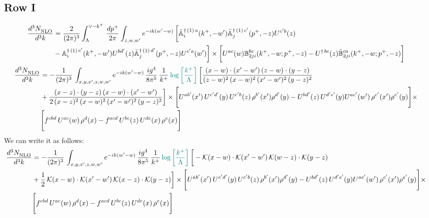 \documentclass[9pt]{article}
\def\mf#1{\mathbb{#1}}
\numberwithin{equation}{section}
\begin{document}
\subsection{Row I}
\begin{align}
 \frac{d^{3}N_{\rm NLO}^{\rm}}{d^{3}k}  & =    \frac{2}{(2\pi)^{3}} \int_{\Lambda}^{\vee - k^{+}}\, \frac{dp^{+}}{2\pi}\int_{z,w,w^{\prime}} e^{-ik(w^{\prime}-w)}\, 
        \bigg[\Bar{\mf{A}}^{\dagger\, (1)\, a}_{i}(k^{+},-w^{\prime})\Bar{\mf{A}}^{\dagger\, (1)\, c^{\prime}}_{j}(p^{+},-z)U^{c^{\prime}b}(z)\notag \\ & -\mf{A}^{\dagger\, (1)\, c^{\prime}}_{i}(k^{+},- w^{\prime})U^{bd^{\prime}}(z)\Bar{\mf{A}}^{\dagger\, (1)\, d^{\prime}}_{j}(p^{+},-z)U^{c^{\prime}a}(w^{\prime})  \bigg]\times \bigg[U^{ac}(w) \mf{B}^{bc}_{2ji}(k^{+},-w;p^{+},-z) -U^{\dagger\, bc}(z)\Bar{\mf{B}}^{ca}_{2ji}(k^{+},-w; p^{+},-z)\bigg] \nonumber
\end{align}
\begin{align}
    \frac{d^{3}N_{\rm NLO}^{\rm}}{d^{3}k}  & = -\frac{1}{(2\pi)^{3}}\, \int_{x,y,x',z,w,w^{\prime}} e^{-ik(w^{\prime}-w)}\,\frac{ig^{4}}{8\pi^{5}}\,\frac{1}{k^{+}}\,{\color{teal}\log{\left[\frac{k^{+}}{\Lambda}\right]}}\,\bigg[\frac{(x-w)\cdot (x'-w')\,(z-w)\cdot (y-z)}{(z-w)^{2}\,(x-w)^{2}\,(x'-w')^{2}\,(y-z)^{2}}\notag \\ & +\frac{(x-z)\cdot (y-z)\,(x-w)\cdot (x'-w')}{2\,(x-z)^{2}\, (x-w)^{2}\,(x'-w')^{2}\,(y-z)^{2}}\bigg]\times  \Bigg[U^{ab'}(x')\,U^{c'd'}(y)\,U^{c'b}(z)\,\rho^{b'}(x')\rho^{d'}(y)-U^{bd'}(z)\,U^{d'e'}(y)U^{ac'}(w')\,\rho^{c'}(x')\rho^{e'}(y)\Bigg]\times\notag \\ & \Bigg[f^{cbd}\,U^{ac}(w)\,\rho^{d}(x)-f^{acd}\, U^{bc}(z)\,U^{de}(x)\,\rho^{e}(x)\Bigg] 
\end{align}
We can write it as follows: 
\begin{align}
    \frac{d^{3}N_{\rm NLO}^{\rm}}{d^{3}k}  & = -\frac{1}{(2\pi)^{3}}\, \int_{x,y,x',z,w,w^{\prime}} e^{-ik(w^{\prime}-w)}\,\frac{ig^{4}}{8\pi^{5}}\,\frac{1}{k^{+}}\,{\color{teal}\log{\left[\frac{k^{+}}{\Lambda}\right]}}\,\bigg[-\mathcal{K}(x-w)\cdot \mathcal{K}(x'-w')\, \mathcal{K}(w-z)\cdot \mathcal{K}(y-z)\notag \\ & +\frac{1}{2}\,\mathcal{K}(x-w)\cdot \mathcal{K}(x'-w')\, \mathcal{K}(x-z)\cdot \mathcal{K}(y-z)\bigg]\times  \Bigg[U^{ab'}(x')\,U^{c'd'}(y)\,U^{c'b}(z)\,\rho^{b'}(x')\rho^{d'}(y)-U^{bd'}(z)\,U^{d'e'}(y)U^{ac'}(w')\,\rho^{c'}(x')\rho^{e'}(y)\Bigg]\times\notag \\ & \Bigg[f^{cbd}\,U^{ac}(w)\,\rho^{d}(x)-f^{acd}\, U^{bc}(z)\,U^{de}(x)\,\rho^{e}(x)\Bigg] 
\end{align}
\end{document}
